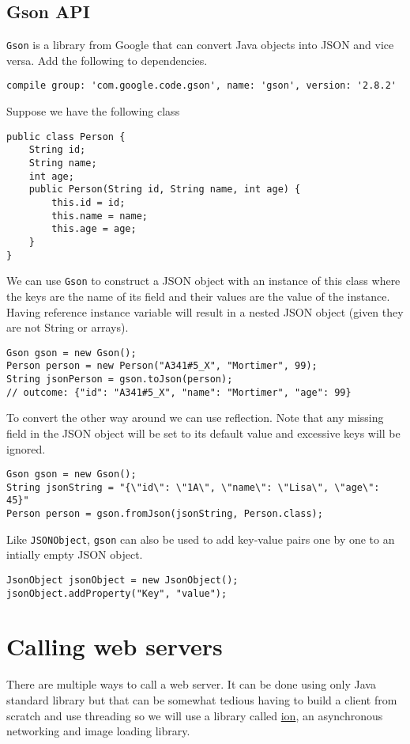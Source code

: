 \subsection{Gson API}
\texttt{Gson} is a library from Google that can convert Java objects into JSON and vice versa. Add the following to dependencies.
\begin{lstlisting}[style=A_txt]
compile group: 'com.google.code.gson', name: 'gson', version: '2.8.2'
\end{lstlisting}
Suppose we have the following class
\begin{lstlisting}[style=A_Java]
public class Person {
	String id;
	String name;
	int age;
	public Person(String id, String name, int age) {
		this.id = id;
		this.name = name;
		this.age = age;
	}
}
\end{lstlisting}
We can use \texttt{Gson} to construct a JSON object with an instance of this class where the keys are the name of its field and their values are the value of the instance. Having reference instance variable will result in a nested JSON object (given they are not String or arrays).
\begin{lstlisting}[style=A_Java]
Gson gson = new Gson();
Person person = new Person("A341#5_X", "Mortimer", 99);
String jsonPerson = gson.toJson(person);
// outcome: {"id": "A341#5_X", "name": "Mortimer", "age": 99}
\end{lstlisting}
To convert the other way around we can use reflection. Note that any missing field in the JSON object will be set to its default value and excessive keys will be ignored.
\begin{lstlisting}[style=A_Java]
Gson gson = new Gson();
String jsonString = "{\"id\": \"1A\", \"name\": \"Lisa\", \"age\": 45}"
Person person = gson.fromJson(jsonString, Person.class);
\end{lstlisting}
Like \texttt{JSONObject}, \texttt{gson} can also be used to add key-value pairs one by one to an intially empty JSON object.
\begin{lstlisting}[style=A_Java]
JsonObject jsonObject = new JsonObject();
jsonObject.addProperty("Key", "value");
\end{lstlisting}

\section{Calling web servers}
There are multiple ways to call a web server. It can be done using only Java standard library but that can be somewhat tedious having to build a client from scratch and use threading so we will use a library called \href{https://github.com/koush/ion}{ion}, an asynchronous networking and image loading library.\\

